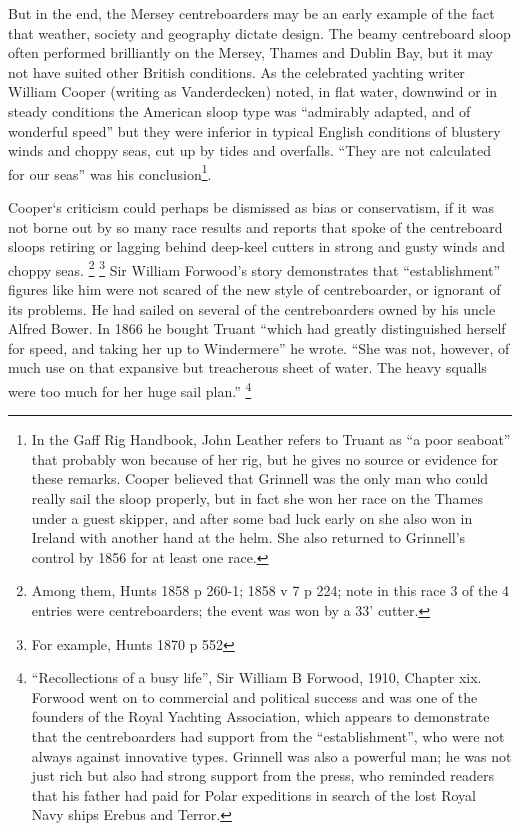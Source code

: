 \documentclass[
  letterpaper,
]{scrbook}
\begin{document}
But in the end, the Mersey centreboarders may be an early example of the
fact that weather, society and geography dictate design. The beamy
centreboard sloop often performed brilliantly on the Mersey, Thames and
Dublin Bay, but it may not have suited other British conditions. As the
celebrated yachting writer William Cooper (writing as Vanderdecken)
noted, in flat water, downwind or in steady conditions the American
sloop type was ``admirably adapted, and of wonderful speed'' but they
were inferior in typical English conditions of blustery winds and choppy
seas, cut up by tides and overfalls. ``They are not calculated for our
seas'' was his conclusion\footnote{In the Gaff Rig Handbook, John
  Leather refers to Truant as ``a poor seaboat'' that probably won
  because of her rig, but he gives no source or evidence for these
  remarks. Cooper believed that Grinnell was the only man who could
  really sail the sloop properly, but in fact she won her race on the
  Thames under a guest skipper, and after some bad luck early on she
  also won in Ireland with another hand at the helm. She also returned
  to Grinnell's control by 1856 for at least one race.}.

Cooper`s criticism could perhaps be dismissed as bias or conservatism,
if it was not borne out by so many race results and reports that spoke
of the centreboard sloops retiring or lagging behind deep-keel cutters
in strong and gusty winds and choppy seas. \footnote{Among them, Hunts
  1858 p 260-1; 1858 v 7 p 224; note in this race 3 of the 4 entries
  were centreboarders; the event was won by a 33' cutter.} \footnote{For
  example, Hunts 1870 p 552} Sir William Forwood's story demonstrates
that ``establishment'' figures like him were not scared of the new style
of centreboarder, or ignorant of its problems. He had sailed on several
of the centreboarders owned by his uncle Alfred Bower. In 1866 he bought
Truant ``which had greatly distinguished herself for speed, and taking
her up to Windermere'' he wrote. ``She was not, however, of much use on
that expansive but treacherous sheet of water. The heavy squalls were
too much for her huge sail plan.'' \footnote{``Recollections of a busy
  life'', Sir William B Forwood, 1910, Chapter xix. Forwood went on to
  commercial and political success and was one of the founders of the
  Royal Yachting Association, which appears to demonstrate that the
  centreboarders had support from the ``establishment'', who were not
  always against innovative types. Grinnell was also a powerful man; he
  was not just rich but also had strong support from the press, who
  reminded readers that his father had paid for Polar expeditions in
  search of the lost Royal Navy ships Erebus and Terror.}
\end{document}

